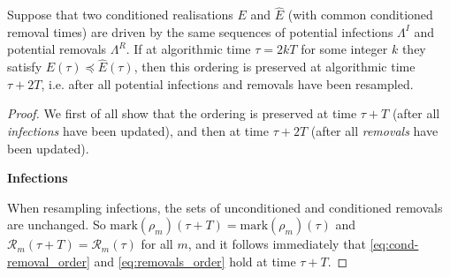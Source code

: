 \documentclass[]{article}
\newcommand{\Removals}{\mathcal{R}}
\newcommand{\Epidemic}{E}%
\newcommand{\ple}{\preceq}
\begin{document}
\begin{thm}
	\label{thm:infections_preserve_ordering}
	Suppose that two conditioned realisations \(\Epidemic\) and \(\hat\Epidemic\) (with common conditioned removal times) are driven by the same sequences of potential infections \(\Lambda^I\) and potential removals \(\Lambda^R\). If at algorithmic time \(\tau = 2kT\) for some integer \(k\) they satisfy \(\Epidemic(\tau) \ple \hat\Epidemic(\tau)\), then this ordering is preserved at algorithmic time \(\tau + 2T\), i.e. after all potential infections and removals have been resampled.
\end{thm}

\begin{proof}
	We first of all show that the ordering is preserved at time \(\tau+T\) (after all \emph{infections} have been updated), and then at time \(\tau+2T\) (after all \emph{removals} have been updated).
	
	\medskip
	\textbf{Infections}
	
	When resampling infections, the sets of unconditioned and conditioned removals are unchanged. So \(\text{mark}(\rho_m)(\tau+T) = \text{mark}(\rho_m)(\tau) \) and \(\Removals_m(\tau+T) = \Removals_m(\tau)\) for all \(m\), and it follows immediately that \eqref{eq:cond-removal_order} and \eqref{eq:removals_order} hold at time \(\tau+T\).
	

\end{proof}
\end{document}

